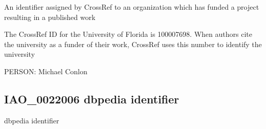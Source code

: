 \documentclass[letterpaper,10pt,english]{sphinxmanual}
\begin{document}
\begin{sphinxShadowBox}

\sphinxAtStartPar
{}
\end{sphinxShadowBox}

\begin{sphinxShadowBox}

\sphinxAtStartPar
{\hyperref[\detokenize{doc-IAO_0000578::doc}]{}}
\end{sphinxShadowBox}

\begin{sphinxShadowBox}

\sphinxAtStartPar
An identifier assigned by CrossRef to an organization which has funded a project resulting in a published work
\end{sphinxShadowBox}

\begin{sphinxShadowBox}

\sphinxAtStartPar
The CrossRef ID for the University of Florida is 100007698.  When authors cite the university as a funder of their work, CrossRef uses this number to identify the university
\end{sphinxShadowBox}

\begin{sphinxShadowBox}

\sphinxAtStartPar
{}
\end{sphinxShadowBox}

\begin{sphinxShadowBox}

\sphinxAtStartPar
PERSON: Michael Conlon
\end{sphinxShadowBox}
\begin{quote}

\ignorespaces \end{quote}


\subsection{IAO\_0022006 \sphinxhyphen{} dbpedia identifier}
\label{\detokenize{doc-IAO_0022006:iao-0022006-dbpedia-identifier}}\label{\detokenize{doc-IAO_0022006:index-0}}\label{\detokenize{doc-IAO_0022006::doc}}
\begin{sphinxShadowBox}

\sphinxAtStartPar
dbpedia identifier
\end{sphinxShadowBox}
\end{document}
